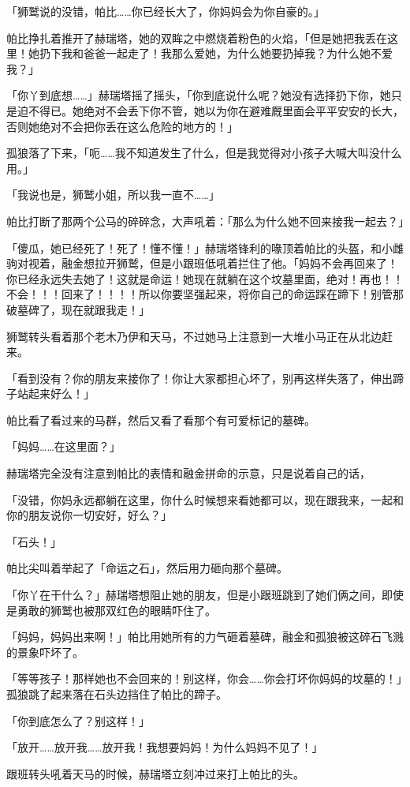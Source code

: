 「狮鹫说的没错，帕比……你已经长大了，你妈妈会为你自豪的。」

帕比挣扎着推开了赫瑞塔，她的双眸之中燃烧着粉色的火焰，「但是她把我丢在这里！她扔下我和爸爸一起走了！我那么爱她，为什么她要扔掉我？为什么她不爱我？」

「你丫到底想……」赫瑞塔摇了摇头，「你到底说什么呢？她没有选择扔下你，她只是迫不得已。她绝对不会丢下你不管，她以为你在避难厩里面会平平安安的长大，否则她绝对不会把你丢在这么危险的地方的！」

孤狼落了下来，「呃……我不知道发生了什么，但是我觉得对小孩子大喊大叫没什么用。」

「我说也是，狮鹫小姐，所以我一直不……」

帕比打断了那两个公马的碎碎念，大声吼着：「那么为什么她不回来接我一起去？」

「傻瓜，她已经死了！死了！懂不懂！」赫瑞塔锋利的喙顶着帕比的头盔，和小雌驹对视着，融金想拉开狮鹫，但是小跟班低吼着拦住了他。「妈妈不会再回来了！你已经永远失去她了！这就是命运！她现在就躺在这个坟墓里面，绝对！再也！！不会！！！回来了！！！！所以你要坚强起来，将你自己的命运踩在蹄下！别管那破墓碑了，现在就跟我走！」

狮鹫转头看着那个老木乃伊和天马，不过她马上注意到一大堆小马正在从北边赶来。

「看到没有？你的朋友来接你了！你让大家都担心坏了，别再这样失落了，伸出蹄子站起来好么！」

帕比看了看过来的马群，然后又看了看那个有可爱标记的墓碑。

「妈妈……在这里面？」

赫瑞塔完全没有注意到帕比的表情和融金拼命的示意，只是说着自己的话，

「没错，你妈永远都躺在这里，你什么时候想来看她都可以，现在跟我来，一起和你的朋友说你一切安好，好么？」

「石头！」

帕比尖叫着举起了「命运之石」，然后用力砸向那个墓碑。

「你丫在干什么？」赫瑞塔想阻止她的朋友，但是小跟班跳到了她们俩之间，即使是勇敢的狮鹫也被那双红色的眼睛吓住了。

「妈妈，妈妈出来啊！」帕比用她所有的力气砸着墓碑，融金和孤狼被这碎石飞溅的景象吓坏了。

「等等孩子！那样她也不会回来的！别这样，你会……你会打坏你妈妈的坟墓的！」孤狼跳了起来落在石头边挡住了帕比的蹄子。

「你到底怎么了？别这样！」

「放开……放开我……放开我！我想要妈妈！为什么妈妈不见了！」

跟班转头吼着天马的时候，赫瑞塔立刻冲过来打上帕比的头。

